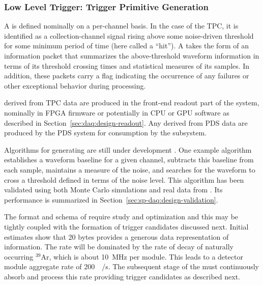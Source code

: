 \subsubsection{Low Level Trigger: Trigger Primitive Generation}
\label{sec:sp-daq:design-trigger-primitives}

A  is defined nominally on a per-channel basis. In the case of
the \single TPC, it is identified as a collection-channel signal rising above some
noise-driven threshold for some minimum period of time (here called a
``hit'').
A  takes the form of an information packet that 
summarizes the above-threshold waveform information in terms of its
threshold crossing times and statistical measures of its  samples. 
In addition, these packets carry a flag indicating the occurrence of any
failures or other exceptional behavior during  processing.

 derived from TPC data
are produced in the front-end readout part of the  system,
nominally in FPGA firmware or potentially in CPU or GPU software as described in
Section~\ref{sec:daq:design-readout}.
Any  derived from PDS data are produced by the PDS system
for consumption by the   subsystem.

Algorithms for generating  are still under development
\cite{docid-11275}. 
One example algorithm\cite{docid-11236} establishes a waveform baseline
for a given channel, subtracts this baseline from each sample, maintains
a measure of the noise, and searches for the waveform to cross a
threshold defined in terms of the noise level.
This algorithm has been validated using both Monte Carlo simulations and
real data from . 
Its performance is summarized in
Section~\ref{sec:sp-daq:design-validation}.

The format and schema of  require study and
optimization and this may be tightly coupled with the formation of
trigger candidates discussed next. 
Initial estimates show that 20 bytes provides a generous data
representation of  information. 
The  rate will be dominated by the rate of decay of naturally occurring
$^{39}$Ar, which is about \SI{10}{\mega\hertz} per module.
This leads to a detector module aggregate rate of
\SI{200}{\mega\byte/\second}.
The subsequent stage of the  must continuously absorb and process this
rate providing trigger candidates as described next.

